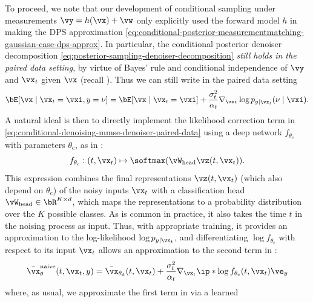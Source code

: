 \documentclass[../../book-main.tex]{subfiles}
\begin{document}
To proceed, we note that our development of conditional sampling under
measurements $\vy = h(\vx) + \vw$ only explicitly used the
forward model $h$ in making the DPS approximation
\eqref{eq:conditional-posterior-measurementmatching-gaussian-case-dps-approx}.
In particular, the conditional posterior denoiser decomposition
\eqref{eq:posterior-sampling-denoiser-decomposition} \textit{still holds in the
paired data setting}, by virtue of Bayes' rule
and conditional independence of $\vy$ and $\vx_t$ given $\vx$ (recall
). Thus we can still write in the paired
data setting
\begin{equation}\label{eq:conditional-denoising-mmse-denoiser-paired-data}
  \bE[ \vx \mid \vx_t=\vxi, y=\nu]
  =
  \bE[\vx \mid \vx_t=\vxi] 
  + \frac{\sigma_t^2}{\alpha_t} 
  \nabla_{\vxi}\log p_{y \mid \vx_t}(\nu\mid \vxi).
\end{equation}
A natural ideal is then to directly implement the likelihood correction term in
\eqref{eq:conditional-denoising-mmse-denoiser-paired-data} using a deep network
$f_{\theta_{\mathrm{c}}}$ with parameters $\theta_{\mathrm{c}}$, as in
: 
\begin{equation}
  f_{\theta_{\mathrm{c}}} : (t, \vx_t) \mapsto \softmax(\vW_{\mathrm{head}}
  \vz(t, \vx_t)).
\end{equation}
This expression combines the final representations $\vz(t, \vx_t)$ (which also depend on
$\theta_{\mathrm{c}}$) of the noisy inputs
$\vx_t$ with a classification head $\vW_{\mathrm{head}} \in \bR^{K \times d}$, which maps the
representations to a probability distribution over the $K$ possible classes.
As is common in practice, it also takes the time $t$ in the noising process as
input.
Thus, with appropriate training, it provides an approximation to the log-likelihood
$\log p_{y \mid \vx_t}$, and differentiating $\log f_{\theta_{\mathrm{c}}}$ with
respect to its input $\vx_t$
allows an approximation to the second term in
:
\begin{equation}\label{eq:conditional-denoising-mmse-denoiser-paired-data-approx}
  \bar{\vx}_{\theta}^{\mathrm{naive}}(t, \vx_t, y)
  =
  \bar{\vx}_{\theta_{\mathrm{d}}}(t, \vx_t)
  + \frac{\sigma_t^2}{\alpha_t}
  \nabla_{\vx_t}
  \ip*{
    \log f_{\theta_{\mathrm{c}}}(t, \vx_t)
  }{
    \ve_{y}
  }
\end{equation}
where, as usual, we approximate the first term in
 via a learned
\end{document}
